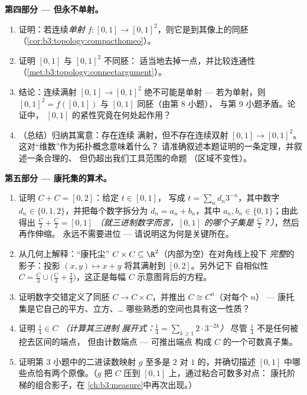 \begin{problem}
\medskip
\noindent\textbf{第四部分 --- 但永不单射。}
\begin{enumerate}[resume]
  \item 证明：若连续\emph{单射} $f \colon [0,1]
        \to [0,1]^2$，则它是到其像上的同胚
        （\cref{cor:b3:topology:compacthomeo}）。
  \item 证明 $[0,1]$ 与 $[0,1]^2$ 不同胚：
        适当地去掉一点，并比较连通性
        （\cref{met:b3:topology:connectargument}）。
  \item 结论：连续满射 $[0,1] \to [0,1]^2$
        绝不可能是单射 --- 若为单射，则
        $[0,1]^2 = f([0,1])$ 与 $[0,1]$ 同胚（由第 8 小题），
        与第 9 小题矛盾。论证中，
        $[0,1]$ 的紧性究竟在何处起作用？
  \item （总结）归纳其寓意：存在连续
        满射，但不存在连续双射 $[0,1] \to
        [0,1]^2$。这对“维数”作为拓扑概念意味着什么？
        请准确叙述本题证明的一条定理，并叙述一条合理的、
        但仍超出我们工具范围的命题
        （区域不变性）。
\end{enumerate}

\medskip
\noindent\textbf{第五部分 --- 康托集的算术。}
\begin{enumerate}[resume]
  \item 证明 $C + C = [0, 2]$：给定 $t \in [0, 1]$，
        写成 $t = \sum_n d_n3^{-n}$，其中数字 $d_n \in \{0,
        1, 2\}$，并把每个数字拆分为 $d_n = a_n + b_n$，其中
        $a_n, b_n \in \{0, 1\}$；由此得出 $\frac C2 +
        \frac C2 = [0, 1]$ \emph{（就三进制数字而言，$[0,1]$ 的哪个子集是
        $\frac C2$？）}，然后再作伸缩。
        永远不需要进位 --- 请说明这为何是关键所在。
  \item 从几何上解释：“康托尘” $C \times
        C \subseteq \R^2$（内部为空）在对角线上投下
        \emph{完整}的影子：投影 $(x,
        y) \mapsto x + y$ 将其满射到 $[0, 2]$。另外记下
        自相似性 $C = \frac C3 \cup \bigl(\frac C3 +
        \frac23\bigr)$，这正是每幅
        $C$ 示意图背后的方程。
  \item 证明数字交错定义了同胚 $C
        \to C \times C$，并推出 $C \cong C^n$（对每个 $n$）
        --- 康托集是它自己的平方、立方、\dots{}
        哪些熟悉的空间也具有这一性质？
  \item 证明 $\frac14 \in C$ \emph{（计算其三进制
        展开式：$\frac14 = \sum_{k\geq1} 2\cdot3^{-2k}$）}
        尽管 $\frac14$ 不是任何被挖去区间的端点，
        但由计数端点 --- 可推出端点
        构成 $C$ 的一个可数真子集。
  \item 证明第 3 小题中的二进读数映射 $g$ 至多是
        $2$ 对 $1$ 的，并确切描述
        $[0,1]$ 中哪些点恰有两个原像。（$g$ 把 $C$ 压到
        $[0,1]$ 上，通过粘合可数多对点：
        康托阶梯的组合影子，在
        \cref{ch:b3:measure}中再次出现。）
\end{enumerate}


\end{problem}
